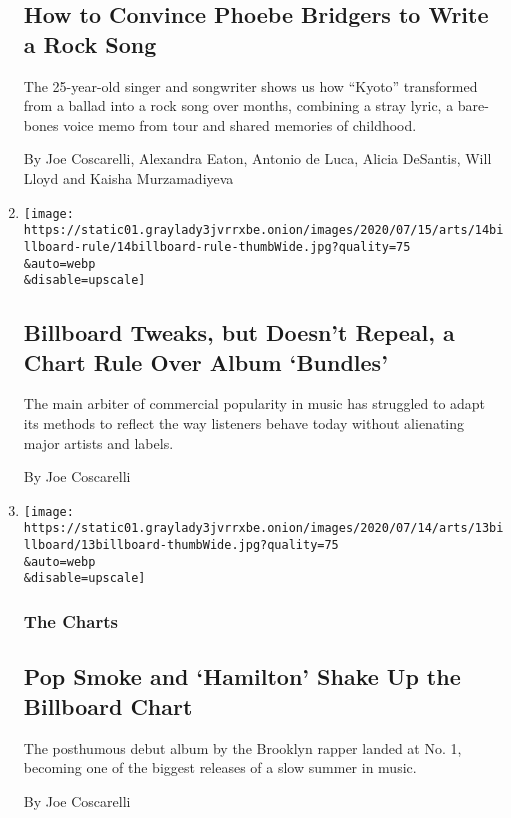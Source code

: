 \begin{enumerate}
  \hypertarget{how-to-convince-phoebe-bridgers-to-write-a-rock-song}{%
  \subsection{How to Convince Phoebe Bridgers to Write a Rock
  Song}\label{how-to-convince-phoebe-bridgers-to-write-a-rock-song}}

  The 25-year-old singer and songwriter shows us how ``Kyoto''
  transformed from a ballad into a rock song over months, combining a
  stray lyric, a bare-bones voice memo from tour and shared memories of
  childhood.

  By Joe Coscarelli, Alexandra Eaton, Antonio de Luca, Alicia DeSantis,
  Will Lloyd and Kaisha Murzamadiyeva
\item
  \href{/2020/07/14/arts/music/billboard-ticket-merchandise-bundles.html}{}

  \texttt{[image: https://static01.graylady3jvrrxbe.onion/images/2020/07/15/arts/14billboard-rule/14billboard-rule-thumbWide.jpg?quality=75\\\&auto=webp\\\&disable=upscale]}

  \hypertarget{billboard-tweaks-but-doesnt-repeal-a-chart-rule-over-album-bundles}{%
  \subsection{Billboard Tweaks, but Doesn't Repeal, a Chart Rule Over
  Album
  `Bundles'}\label{billboard-tweaks-but-doesnt-repeal-a-chart-rule-over-album-bundles}}

  The main arbiter of commercial popularity in music has struggled to
  adapt its methods to reflect the way listeners behave today without
  alienating major artists and labels.

  By Joe Coscarelli
\item
  \href{/2020/07/13/arts/music/pop-smoke-hamilton-billboard-chart.html}{}

  \texttt{[image: https://static01.graylady3jvrrxbe.onion/images/2020/07/14/arts/13billboard/13billboard-thumbWide.jpg?quality=75\\\&auto=webp\\\&disable=upscale]}

  \hypertarget{the-charts}{%
  \subsubsection{The Charts}\label{the-charts}}

  \hypertarget{pop-smoke-and-hamilton-shake-up-the-billboard-chart}{%
  \subsection{Pop Smoke and `Hamilton' Shake Up the Billboard
  Chart}\label{pop-smoke-and-hamilton-shake-up-the-billboard-chart}}

  The posthumous debut album by the Brooklyn rapper landed at No. 1,
  becoming one of the biggest releases of a slow summer in music.

  By Joe Coscarelli
\end{enumerate}

